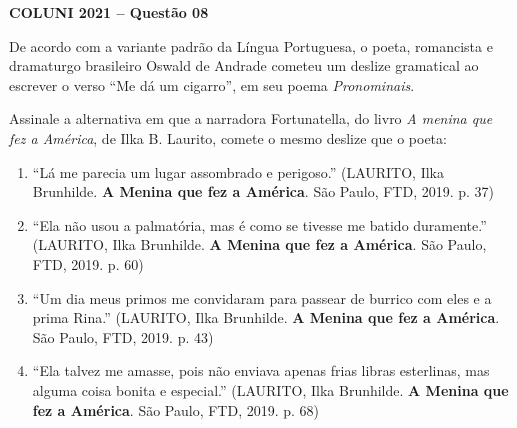 \textbf{COLUNI 2021 -- Questão 08}\par\medskip De acordo com a variante padrão da Língua Portuguesa, o poeta, romancista e dramaturgo brasileiro Oswald de Andrade cometeu um deslize gramatical ao escrever o verso “Me dá um cigarro”, em seu poema \textit{Pronominais}.

\par

Assinale a alternativa em que a narradora Fortunatella, do livro \textit{A menina que fez a América}, de Ilka B. Laurito, comete o mesmo deslize que o poeta:\begin{enumerate}
\item “Lá me parecia um lugar assombrado e perigoso.” (LAURITO, Ilka Brunhilde. \textbf{A Menina que fez a América}. São Paulo,
      FTD, 2019. p. 37)
\item “Ela não usou a palmatória, mas é como se tivesse me batido duramente.” (LAURITO, Ilka Brunhilde. \textbf{A Menina que fez a América}. São Paulo, FTD, 2019. p. 60)
\item “Um dia meus primos me convidaram para passear de burrico com eles e a prima Rina.” (LAURITO, Ilka
      Brunhilde. \textbf{A Menina que fez a América}. São Paulo, FTD, 2019. p. 43)
\item “Ela talvez me amasse, pois não enviava apenas frias libras esterlinas, mas alguma coisa bonita e
      especial.” (LAURITO, Ilka Brunhilde. \textbf{A Menina que fez a América}. São Paulo, FTD, 2019. p. 68)\end{enumerate}

